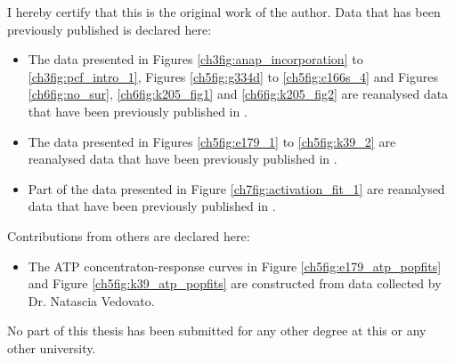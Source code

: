 I hereby certify that this is the original work of the author.
Data that has been previously published is declared here:
\begin{itemize}
\item The data presented in Figures \ref{ch3fig:anap_incorporation} to \ref{ch3fig:pcf_intro_1}, Figures \ref{ch5fig:g334d} to \ref{ch5fig:c166s_4} and Figures \ref{ch6fig:no_sur}, \ref{ch6fig:k205_fig1} and \ref{ch6fig:k205_fig2} are reanalysed data that have been previously published in \textcite{usher_nucleotide_2020}.
\item The data presented in Figures \ref{ch5fig:e179_1} to \ref{ch5fig:k39_2} are reanalysed data that have been previously published in \textcite{pipatpolkai_dynamic_2021}.
\item Part of the data presented in Figure \ref{ch7fig:activation_fit_1} are reanalysed data that have been previously published in \textcite{puljung_activation_2019}.
\end{itemize}
Contributions from others are declared here:
\begin{itemize}
\item The ATP concentraton-response curves in Figure \ref{ch5fig:e179_atp_popfits} and Figure \ref{ch5fig:k39_atp_popfits} are constructed from data collected by Dr. Natascia Vedovato.
\end{itemize}

No part of this thesis has been submitted for any other degree at this or any other university.